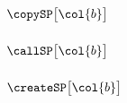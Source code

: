 \subsubsection{$\copySP\big[\col{b}\big]$                                                         \lispDone{}}  \label{hub: stack patterns: copy}             
\subsubsection{$\callSP\big[\col{b}\big]$                                                         \lispDone{}}  \label{hub: stack patterns: call}             
\subsubsection{$\createSP\big[\col{b}\big]$                                                       \lispDone{}}  \label{hub: stack patterns: create}           
